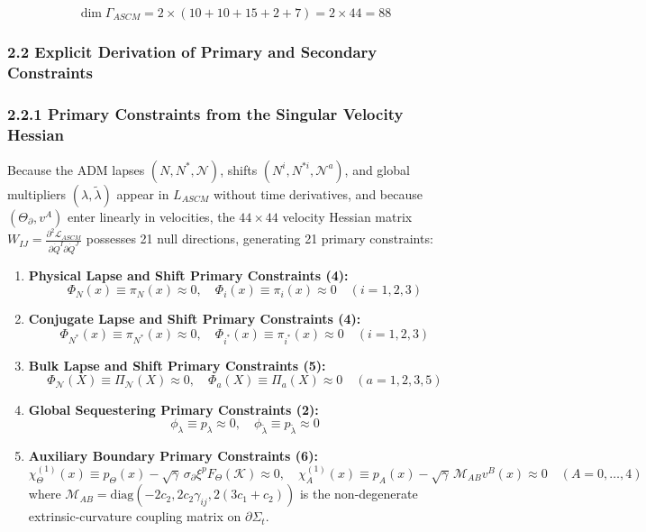 \documentclass[aps,prd,onecolumn,superscriptaddress,nofootinbib,longbibliography,10pt]{revtex4-2}
\begin{document}
  \[ \dim\Gamma_{ASCM} = 2 \times (10 + 10 + 15 + 2 + 7) = 2 \times 44 = 88 \]
  
  
\subsubsection*{2.2 Explicit Derivation of Primary and Secondary Constraints}

  
\subsubsection*{2.2.1 Primary Constraints from the Singular Velocity Hessian}

  Because the ADM lapses \((N, N^*, \mathcal{N})\), shifts \((N^i, N^{*i}, \mathcal{N}^a)\), and global multipliers \((\lambda, \tilde{\lambda})\) appear in \(L_{ASCM}\) without time derivatives, and because \((\Theta_\partial, v^A)\) enter linearly in velocities, the \(44 \times 44\) velocity Hessian matrix \(W_{IJ} = \frac{\partial^2\mathcal{L}_{ASCM}}{\partial\dot{Q}^I\partial\dot{Q}^J}\) possesses 21 null directions, generating 21 primary constraints:


  
\begin{enumerate}
    
\item \textbf{Physical Lapse and Shift Primary Constraints (4):}
    \[ \Phi_N(x) \equiv \pi_N(x) \approx 0, \quad \Phi_i(x) \equiv \pi_i(x) \approx 0 \quad (i = 1,2,3) \]
    
\item \textbf{Conjugate Lapse and Shift Primary Constraints (4):}
    \[ \Phi_{N^*}(x) \equiv \pi_{N^*}(x) \approx 0, \quad \Phi_{i^*}(x) \equiv \pi_{i^*}(x) \approx 0 \quad (i = 1,2,3) \]
    
\item \textbf{Bulk Lapse and Shift Primary Constraints (5):}
    \[ \Phi_{\mathcal{N}}(X) \equiv \Pi_{\mathcal{N}}(X) \approx 0, \quad \Phi_a(X) \equiv \Pi_a(X) \approx 0 \quad (a = 1,2,3,5) \]
    
\item \textbf{Global Sequestering Primary Constraints (2):}
    \[ \phi_\lambda \equiv p_\lambda \approx 0, \quad \phi_{\tilde{\lambda}} \equiv p_{\tilde{\lambda}} \approx 0 \]
    
\item \textbf{Auxiliary Boundary Primary Constraints (6):}
    \[ \chi_\Theta^{(1)}(x) \equiv p_\Theta(x) - \sqrt{\gamma}\,\sigma_\partial\xi^p F_\Theta(\mathcal{K}) \approx 0, \quad \chi_A^{(1)}(x) \equiv p_A(x) - \sqrt{\gamma}\,\mathcal{M}_{AB}v^B(x) \approx 0 \quad (A = 0,\dots,4) \]
    where \(\mathcal{M}_{AB} = \text{diag}(-2c_2, 2c_2\gamma_{ij}, 2(3c_1 + c_2))\) is the non-degenerate extrinsic-curvature coupling matrix on \(\partial\Sigma_t\).
  
\end{enumerate}
\end{document}
